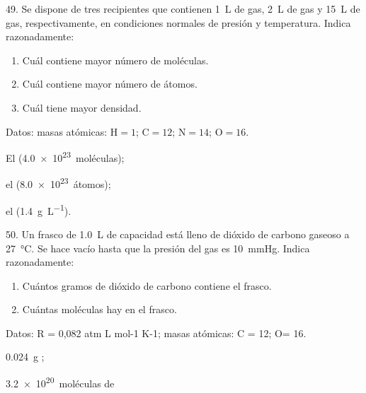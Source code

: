 \documentclass[10pt]{article}
\begin{document}
\begin{multicols}{2}
\begin{exercise}
  49. Se dispone de tres recipientes que contienen \SI{1}{\liter} de  gas,
  \SI{2}{\liter} de  gas y \SI{15}{\liter} de  gas, respectivamente, en condiciones normales de presión y temperatura. Indica razonadamente:
  \begin{enumerate}
    \item Cuál contiene mayor número de moléculas.
    \item Cuál contiene mayor número de átomos.
    \item Cuál tiene mayor densidad.
  \end{enumerate}
  Datos: masas atómicas: $\textrm{H} = 1$; $\textrm{C} = 12$; $\textrm{N} = 14$; $\textrm{O} = 16$.
\end{exercise}
\begin{solution}
  \begin{enumerate*}
    \item El  (\SI{4.0e23}{moléculas});
    \item el  (\SI{8.0e23}{átomos});
    \item el  (\SI{1.4}{\gram\per\liter}).
  \end{enumerate*}
\end{solution}

\begin{exercise}
  50. Un frasco de \SI{1.0}{\liter} de capacidad está lleno de dióxido de carbono gaseoso a \SI{27}{\celsius}. Se hace vacío hasta que la presión del
  gas es \SI{10}{\mmHg}. Indica razonadamente:
  \begin{enumerate}
    \item Cuántos gramos de dióxido de carbono contiene el frasco.
    \item Cuántas moléculas hay en el frasco.
  \end{enumerate}
  Datos: R = 0,082 atm L mol-1 K-1; masas atómicas: C = 12; O= 16.
\end{exercise}
\begin{solution}
  \begin{enumerate*}
    \item \SI{0.024}{\gram} ;
    \item \SI{3.2e20}{moléculas} de 
  \end{enumerate*}
\end{solution}

\end{multicols}
\end{document}

